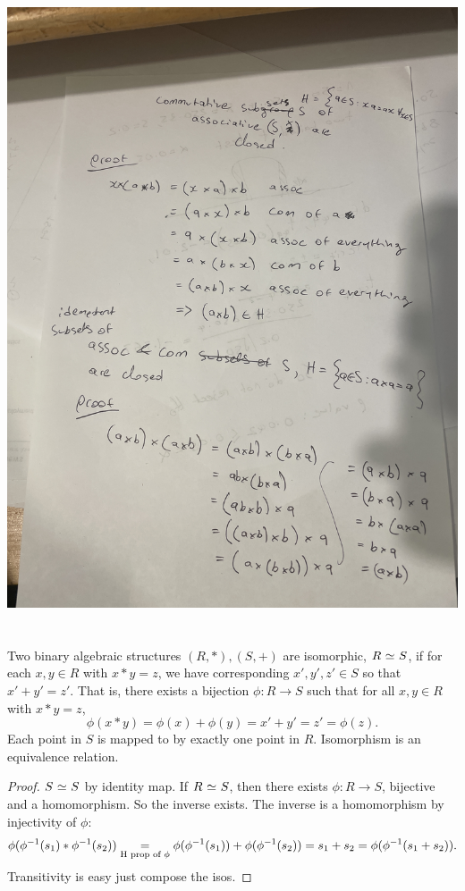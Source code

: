 \begin{center}
\includegraphics[scale=0.4, angle=-90]{fig/IMG_7244.jpeg}
\end{center}
\section*{}
Two binary algebraic structures $(R,*),(S,+)$ are isomorphic, $R \operatorname{\,\simeq\,} S$, if for each $x,y \in R$ with $x*y = z$,
we have corresponding $x',y',z' \in S$ so that $x' + y' = z'$. That is,
there exists a bijection $\phi:R \to S$ such that for all $x,y \in R$ with $x*y=z$,
\[
\phi(x*y) = \phi(x)+\phi(y) = x'+y' = z' = \phi(z).
\]
Each point in $S$ is mapped to by exactly one point in $R$. Isomorphism is an equivalence relation.
\begin{proof}
$S \operatorname{\,\simeq\,} S$ by identity map. If $R \operatorname{\,\simeq\,} S$, then there exists $\phi:R \to S$, bijective and a homomorphism. So the inverse exists.
The inverse is a homomorphism by injectivity of $\phi$: $$
\phi(\phi^{-1}(s_1)*\phi^{-1}(s_2)) \underset{\text{H prop of $\phi$}}{=} \phi(\phi^{-1}(s_1))+\phi(\phi^{-1}(s_2)) = s_1 + s_2 = \phi(\phi^{-1}(s_1+s_2)).
$$
Transitivity is easy just compose the isos.
\end{proof}
